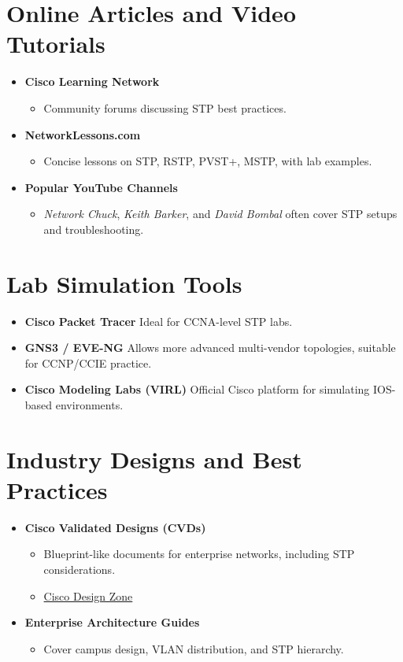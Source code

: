 \documentclass[a4paper]{report}
\begin{document}
\section{Online Articles and Video Tutorials}
\begin{itemize}
    \item \textbf{Cisco Learning Network}
    \begin{itemize}
        \item Community forums discussing STP best practices.
    \end{itemize}
    \item \textbf{NetworkLessons.com}
    \begin{itemize}
        \item Concise lessons on STP, RSTP, PVST+, MSTP, with lab examples.
    \end{itemize}
    \item \textbf{Popular YouTube Channels}
    \begin{itemize}
        \item \textit{Network Chuck}, \textit{Keith Barker}, and \textit{David Bombal} often cover STP setups and troubleshooting.
    \end{itemize}
\end{itemize}

\section{Lab Simulation Tools}
\begin{itemize}
    \item \textbf{Cisco Packet Tracer} \textendash{} Ideal for CCNA-level STP labs.
    \item \textbf{GNS3 / EVE-NG} \textendash{} Allows more advanced multi-vendor topologies, suitable for CCNP/CCIE practice.
    \item \textbf{Cisco Modeling Labs (VIRL)} \textendash{} Official Cisco platform for simulating IOS-based environments.
\end{itemize}

\section{Industry Designs and Best Practices}
\begin{itemize}
    \item \textbf{Cisco Validated Designs (CVDs)}
    \begin{itemize}
        \item Blueprint-like documents for enterprise networks, including STP considerations.
        \item \href{https://www.cisco.com/c/en/us/solutions/enterprise/design-zone.html}{Cisco Design Zone}
    \end{itemize}
    \item \textbf{Enterprise Architecture Guides}
    \begin{itemize}
        \item Cover campus design, VLAN distribution, and STP hierarchy.
    \end{itemize}
\end{itemize}
\end{document}
